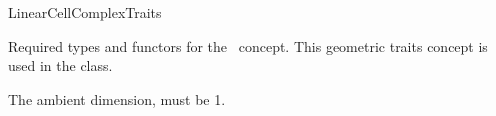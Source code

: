 \ccRefPageBegin

\begin{ccRefConcept}{LinearCellComplexTraits}

Required types and functors for the \ccRefName\ concept. This
geometric traits concept is used in the 
class.  



\ccConstants
{}
{The ambient dimension, must be \mygt{}1.}

\ccTypes


\ccGlue
{}
\ccGlue
{}
\ccGlue
{}



\end{ccRefConcept}

